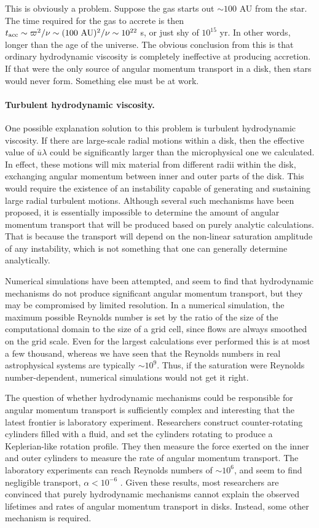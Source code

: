 This is obviously a problem. Suppose the gas starts out $\sim 100$ AU from the star. The time required for the gas to accrete is then $t_{\rm acc}\sim \varpi^2/\nu \sim (100\mbox{ AU})^2/\nu \sim 10^{22}$ s, or just shy of $10^{15}$ yr. In other words, longer than the age of the universe. The obvious conclusion from this is that ordinary hydrodynamic viscosity is completely ineffective at producing accretion. If that were the only source of angular momentum transport in a disk, then stars would never form. Something else must be at work.

\paragraph{Turbulent hydrodynamic viscosity.}

One possible explanation solution to this problem is turbulent hydrodynamic viscosity. If there are large-scale radial motions within a disk, then the effective value of $\overline{u}\lambda$ could be significantly larger than the microphysical one we calculated. In effect, these motions will mix material from different radii within the disk, exchanging angular momentum between inner and outer parts of the disk. This would require the existence of an instability capable of generating and sustaining large radial turbulent motions. Although several such mechanisms have been proposed, it is essentially impossible to determine the amount of angular momentum transport that will be produced based on purely analytic calculations. That is because the transport will depend on the non-linear saturation amplitude of any instability, which is not something that one can generally determine analytically.

Numerical simulations have been attempted, and seem to find that hydrodynamic mechanisms do not produce significant angular momentum transport, but they may be compromised by limited resolution. In a numerical simulation, the maximum possible Reynolds number is set by the ratio of the size of the computational domain to the size of a grid cell, since flows are always smoothed on the grid scale. Even for the largest calculations ever performed this is at most a few thousand, whereas we have seen that the Reynolds numbers in real astrophysical systems are typically $\sim 10^9$. Thus, if the saturation were Reynolds number-dependent, numerical simulations would not get it right.

The question of whether hydrodynamic mechanisms could be responsible for angular momentum transport is sufficiently complex and interesting that the latest frontier is laboratory experiment. Researchers construct counter-rotating cylinders filled with a fluid, and set the cylinders rotating to produce a Keplerian-like rotation profile. They then measure the force exerted on the inner and outer cylinders to measure the rate of angular momentum transport. The laboratory experiments can reach Reynolds numbers of $\sim 10^6$, and seem to find negligible transport, $\alpha < 10^{-6}$ \citep{ji06a}. Given these results, most researchers are convinced that purely hydrodynamic mechanisms cannot explain the observed lifetimes and rates of angular momentum transport in disks. Instead, some other mechanism is required.

